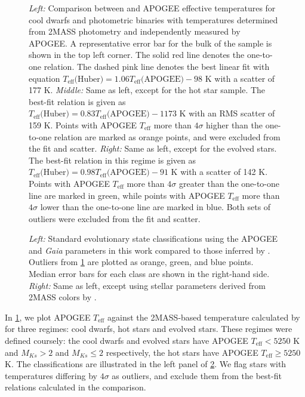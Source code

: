 \documentclass[preprint2]{aastex62}
\newcommand{\Gaia}{\mbox{\textit{Gaia}}}
\newcommand{\Teff}{\ensuremath{T_{\textrm{eff}}}}
\newcommand{\Ks}{\ensuremath{Ks}}
\newcommand{\MK}{\ensuremath{M_{\Ks}}}
\begin{document}
\begin{figure}[htb]
    \centering
    \caption{\emph{Left:} Comparison between \citet{Huber14} and APOGEE
    effective temperatures for cool dwarfs and photometric binaries with 
    temperatures determined from
    2MASS photometry and independently measured by APOGEE\@. A representative
    error bar for the bulk of the sample is shown in the top left corner. The 
    solid red line denotes the one-to-one relation. The dashed pink line 
    denotes the best linear fit with equation \(\Teff \textrm{(Huber)} = 1.06
\Teff \textrm{(APOGEE)} - 98 \textrm{ K}\) with a scatter of 177 K. 
\emph{Middle:} Same as left, except for the hot star sample. The 
best-fit relation is given as \(\Teff \textrm{(Huber)} = 0.83 \Teff 
\textrm{(APOGEE)} - 1173 \textrm{ K}\) with an RMS scatter of 159 K. Points 
with APOGEE \Teff{} more than \(4\sigma\) higher than the one-to-one relation 
are marked as orange points, and were excluded from the fit and scatter. 
\emph{Right:} Same as left, except for the evolved stars. The best-fit 
relation in this regime is given as \(\Teff \textrm{(Huber)} = 0.98 \Teff 
    \textrm{(APOGEE)} - 91 \textrm{ K}\) with a scatter of 142 K. Points with 
    APOGEE \Teff{} more than \(4\sigma\) greater than the one-to-one line are 
    marked in green, while points with APOGEE \Teff{} more than \(4\sigma\) 
    lower than the one-to-one line are marked in blue. Both sets of outliers 
were excluded from the fit and scatter.}
    \label{fig:huber_comparison}
\end{figure}

\begin{figure}[htb]
    \centering
    \caption{\emph{Left:} Standard evolutionary state classifications using the
    APOGEE and \Gaia{} parameters in this work compared to those inferred by
    \citet{Huber14}. Outliers from \cref{fig:huber_comparison} are plotted as 
    orange, green, and blue points.  Median error bars for each class are 
    shown in the right-hand side. \emph{Right:} Same as left, except using 
    stellar parameters derived from 2MASS colors by \citet{Huber14}.}
    \label{fig:hub_class}
\end{figure}

In \cref{fig:huber_comparison}, we plot APOGEE \Teff{} against the 2MASS-based 
temperature calculated by \citet{Huber14} for three regimes: 
cool dwarfs, hot stars and evolved stars. These regimes were defined coursely:
the cool dwarfs and evolved stars have APOGEE \(\Teff < 5250\) K and 
\(\MK > 2\) and \(\MK \le 2\) respectively, the 
hot stars have APOGEE \(\Teff \ge 5250\) K. The classifications are illustrated
in the left panel of \cref{fig:hub_class}. We flag stars with temperatures 
differing by \(4\sigma\) as outliers, and exclude them from the best-fit 
relations calculated in the comparison.
\end{document}
